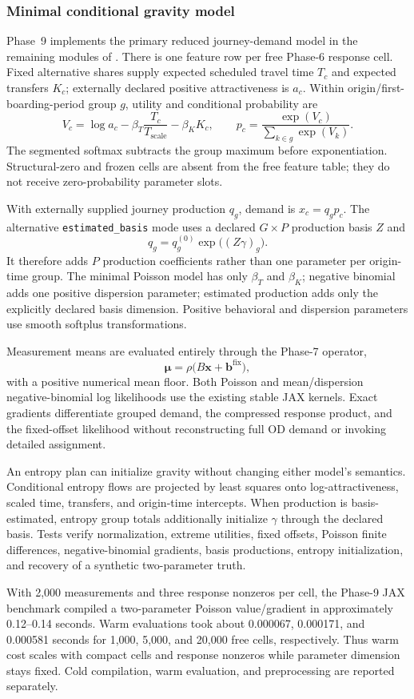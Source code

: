 \subsubsection{Minimal conditional gravity model}
\label{sec:reduced-od-minimal-gravity}

Phase~9 implements the primary reduced journey-demand model in the remaining
modules of .  There is one
feature row per free Phase-6 response cell.  Fixed alternative shares supply
expected scheduled travel time $T_c$ and expected transfers $K_c$; externally
declared positive attractiveness is $a_c$.  Within origin/first-boarding-period
group $g$, utility and conditional probability are
\[
V_c=\log a_c
-\beta_T\frac{T_c}{T_{\mathrm{scale}}}
-\beta_K K_c,
\qquad
p_c=\frac{\exp(V_c)}{\sum_{k\in g}\exp(V_k)}.
\]
The segmented softmax subtracts the group maximum before exponentiation.
Structural-zero and frozen cells are absent from the free feature table; they
do not receive zero-probability parameter slots.

With externally supplied journey production $q_g$, demand is $x_c=q_gp_c$.
The alternative \texttt{estimated\_basis} mode uses a declared $G\times P$
production basis $Z$ and
\[
q_g=q_g^{(0)}\exp\bigl((Z\gamma)_g\bigr).
\]
It therefore adds $P$ production coefficients rather than one parameter per
origin-time group.  The minimal Poisson model has only $\beta_T$ and $\beta_K$;
negative binomial adds one positive dispersion parameter; estimated production
adds only the explicitly declared basis dimension.  Positive behavioral and
dispersion parameters use smooth softplus transformations.

Measurement means are evaluated entirely through the Phase-7 operator,
\[
\bm\mu=\rho\bigl(B\bm x+\bm b^{\mathrm{fix}}\bigr),
\]
with a positive numerical mean floor.  Both Poisson and mean/dispersion
negative-binomial log likelihoods use the existing stable JAX kernels.  Exact
gradients differentiate grouped demand, the compressed response product, and
the fixed-offset likelihood without reconstructing full OD demand or invoking
detailed assignment.

An entropy plan can initialize gravity without changing either model's
semantics.  Conditional entropy flows are projected by least squares onto
log-attractiveness, scaled time, transfers, and origin-time intercepts.  When
production is basis-estimated, entropy group totals additionally initialize
$\gamma$ through the declared basis.  Tests verify normalization, extreme
utilities, fixed offsets, Poisson finite differences, negative-binomial
gradients, basis productions, entropy initialization, and recovery of a
synthetic two-parameter truth.

With 2,000 measurements and three response nonzeros per cell, the Phase-9 JAX
benchmark compiled a two-parameter Poisson value/gradient in approximately
0.12--0.14 seconds.  Warm evaluations took about 0.000067, 0.000171, and
0.000581 seconds for 1,000, 5,000, and 20,000 free cells, respectively.  Thus
warm cost scales with compact cells and response nonzeros while parameter
dimension stays fixed.  Cold compilation, warm evaluation, and preprocessing
are reported separately.

